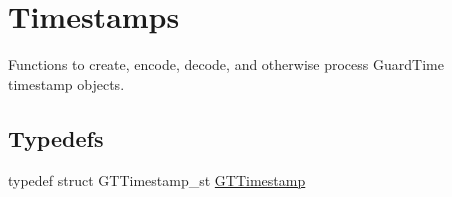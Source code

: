 \hypertarget{group__timestamps}{
\section{Timestamps}
\label{group__timestamps}
}


Functions to create, encode, decode, and otherwise process GuardTime timestamp objects.  


\subsection*{Typedefs}
\begin{DoxyCompactItemize}
\item 
typedef struct GTTimestamp\_\-st \hyperlink{group__timestamps_gaddb792efe52216386853c94e7aeaf6ba}{GTTimestamp}
\end{DoxyCompactItemize}
